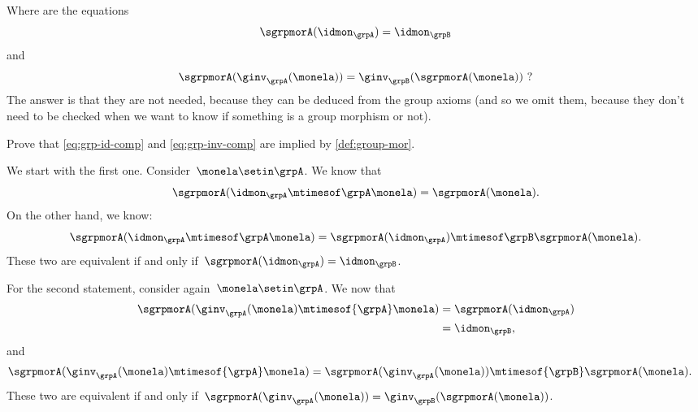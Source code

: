 Where are the equations
\begin{equation}
    \label{eq:grp-id-comp}
    \sgrpmorA (\idmon_\grpA) = \idmon_{\grpB}
\end{equation}
and
\begin{equation}
    \label{eq:grp-inv-comp}
    \sgrpmorA (\ginv_\grpA(\monela)) = \ginv_\grpB(\sgrpmorA(\monela)) \ ?
\end{equation}
%
The answer is that they are not needed, because they can be deduced from the group axioms (and so we omit them, because they don't need to be checked when we want to know if something is a group morphism or not).

\begin{exercise}
    Prove that \cref{eq:grp-id-comp} and \cref{eq:grp-inv-comp} are implied by \cref{def:group-mor}.
\end{exercise}
\begin{solution}
    We start with the first one.
    Consider~$\monela \setin \grpA$.
    We know that
    \begin{equation}
        \sgrpmorA(\idmon_\grpA \mtimesof\grpA \monela)=\sgrpmorA(\monela).
    \end{equation}
    On the other hand, we know:
    \begin{equation}
        \sgrpmorA(\idmon_\grpA \mtimesof\grpA \monela) = \sgrpmorA(\idmon_\grpA)\mtimesof\grpB \sgrpmorA(\monela).
    \end{equation}
    These two are equivalent if and only if~$\sgrpmorA(\idmon_\grpA)=\idmon_\grpB$.

    For the second statement, consider again~$\monela \setin \grpA$.
    We now that
    \begin{equation}
        \begin{aligned}
            \sgrpmorA(\ginv_{\grpA}(\monela)\mtimesof{\grpA} \monela) & =\sgrpmorA(\idmon_\grpA) \\
                                                                      & =\idmon_\grpB,
        \end{aligned}
    \end{equation}
    and
    \begin{equation}
        \begin{aligned}
            \sgrpmorA(\ginv_{\grpA}(\monela)\mtimesof{\grpA} \monela) & =\sgrpmorA(\ginv_{\grpA}(\monela))\mtimesof{\grpB} \sgrpmorA(\monela).
        \end{aligned}
    \end{equation}
    These two are equivalent if and only if~$\sgrpmorA(\ginv_{\grpA}(\monela))=\ginv_{\grpB}(\sgrpmorA(\monela))$.

\end{solution}

